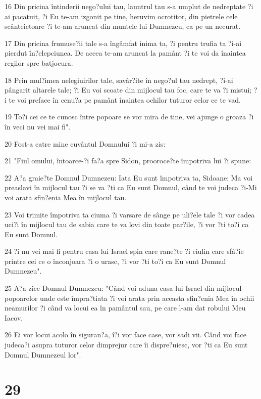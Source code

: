 \par 16 Din pricina întinderii nego?ului tau, launtrul tau s-a umplut de nedreptate ?i ai pacatuit, ?i Eu te-am izgonit pe tine, heruvim ocrotitor, din pietrele cele scânteietoare ?i te-am aruncat din muntele lui Dumnezeu, ca pe un necurat.
\par 17 Din pricina frumuse?ii tale s-a îngâmfat inima ta, ?i pentru trufia ta ?i-ai pierdut în?elepciunea. De aceea te-am aruncat la pamânt ?i te voi da înaintea regilor spre batjocura.
\par 18 Prin mul?imea nelegiuirilor tale, savâr?ite în nego?ul tau nedrept, ?i-ai pângarit altarele tale; ?i Eu voi scoate din mijlocul tau foc, care te va ?i mistui; ?i te voi preface în cenu?a pe pamânt înaintea ochilor tuturor celor ce te vad.
\par 19 To?i cei ce te cunosc între popoare se vor mira de tine, vei ajunge o groaza ?i în veci nu vei mai fi".
\par 20 Fost-a catre mine cuvântul Domnului ?i mi-a zis:
\par 21 "Fiul omului, întoarce-?i fa?a spre Sidon, prooroce?te împotriva lui ?i spune:
\par 22 A?a graie?te Domnul Dumnezeu: Iata Eu sunt împotriva ta, Sidoane; Ma voi preaslavi în mijlocul tau ?i se va ?ti ca Eu sunt Domnul, când te voi judeca ?i-Mi voi arata sfin?enia Mea în mijlocul tau.
\par 23 Voi trimite împotriva ta ciuma ?i varsare de sânge pe uli?ele tale ?i vor cadea uci?i în mijlocul tau de sabia care te va lovi din toate par?ile, ?i vor ?ti to?i ca Eu sunt Domnul.
\par 24 ?i nu vei mai fi pentru casa lui Israel spin care rane?te ?i ciulin care sfâ?ie printre cei ce o înconjoara ?i o urasc, ?i vor ?ti to?i ca Eu sunt Domnul Dumnezeu".
\par 25 A?a zice Domnul Dumnezeu: "Când voi aduna casa lui Israel din mijlocul popoarelor unde este împra?tiata ?i voi arata prin aceasta sfin?enia Mea în ochii neamurilor ?i când va locui ea în pamântul sau, pe care l-am dat robului Meu Iacov,
\par 26 Ei vor locui acolo în siguran?a, î?i vor face case, vor sadi vii. Când voi face judeca?i asupra tuturor celor dimprejur care îi dispre?uiesc, vor ?ti ca Eu sunt Domnul Dumnezeul lor".

\chapter{29}

